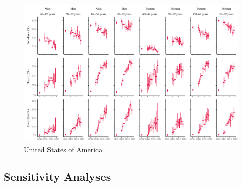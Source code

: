 \documentclass[12pt]{article}
\begin{document}
\begin{appendix}
\begin{refsection}
\begin{landscape}
        \begin{figure}[H]
            \centering
            \includegraphics[width=\linewidth]{../3_figures/countries/fig_united states of america.pdf}
            \caption{United States of America}
            \label{fig:usa}
        \end{figure}
    \end{landscape}

    \subsection{Sensitivity Analyses}
    \begin{singlespace}
        
    \end{singlespace}

    \clearpage

    \begin{singlespace}
        
    \end{singlespace}
    \clearpage

    
\end{refsection}
\printbibliography[section=2,resetnumbers=true]
        

\end{appendix}
\end{document}

